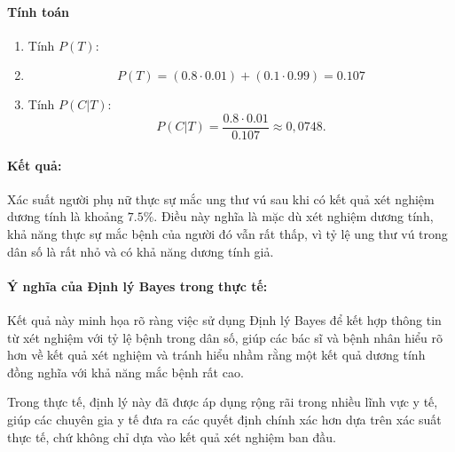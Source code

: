 \begin{vidu}
\paragraph{Tính toán}
\begin{enumerate}
    \item Tính $P(T)$:
    \item \begin{equation*}
        P(T)=(0.8\cdot 0.01)+(0.1\cdot 0.99)=0.107
    \end{equation*}
    \item Tính $P(C\vert T)$:
    \begin{equation*}
    P(C\vert T)=\frac{0.8\cdot 0.01}{0.107}\approx 0,0748.
    \end{equation*}
\end{enumerate}
\paragraph{Kết quả:} Xác suất người phụ nữ thực sự mắc ung thư vú sau khi có kết quả xét nghiệm dương tính là khoảng $7.5\%$. Điều này nghĩa là mặc dù xét nghiệm dương tính, khả năng thực sự mắc bệnh của người đó vẫn rất thấp, vì tỷ lệ ung thư vú trong dân số là rất nhỏ và có khả năng dương tính giả.
\paragraph{Ý nghĩa của Định lý Bayes trong thực tế:} Kết quả này minh họa rõ ràng việc sử dụng Định lý Bayes để kết hợp thông tin từ xét nghiệm với tỷ lệ bệnh trong dân số, giúp các bác sĩ và bệnh nhân hiểu rõ hơn về kết quả xét nghiệm và tránh hiểu nhầm rằng một kết quả dương tính đồng nghĩa với khả năng mắc bệnh rất cao.

Trong thực tế, định lý này đã được áp dụng rộng rãi trong nhiều lĩnh vực y tế, giúp các chuyên gia y tế đưa ra các quyết định chính xác hơn dựa trên xác suất thực tế, chứ không chỉ dựa vào kết quả xét nghiệm ban đầu.
\end{vidu}
    
